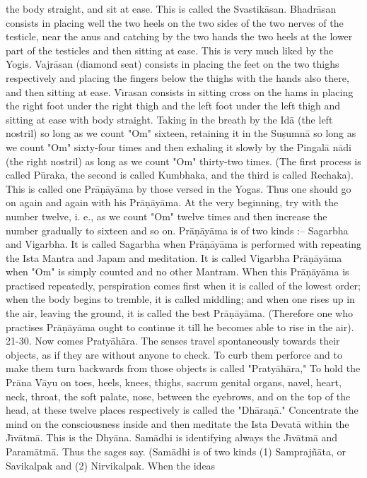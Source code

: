 the body straight, and sit at ease. This is called the Svastik\=asan. Bhadr\=asan consists in placing well the two heels on the two sides of the two nerves of the testicle, near the anus and catching by the two hands the two heels at the lower part of the testicles and then sitting at ease. This is very much liked by the Yogis. Vajr\=asan (diamond seat) consists in placing the feet on the two thighs respectively and placing the fingers below the thighs with the hands also there, and then sitting at ease. V\={\i}rasan consists in sitting cross on the hams in placing the right foot under the right thigh and the left foot under the left thigh and sitting at ease with body straight.
Taking in the breath by the Id\=a (the left nostril) so long as we count "Om" sixteen, retaining it in the Su\d{s}umn\=a so long as we count "Om" sixty-four times and then exhaling it slowly by the Pingal\=a n\=adi (the right nostril) as long as we count "Om" thirty-two times. (The first process is called P\=uraka, the second is called Kumbhaka, and the third is called Rechaka). This is called one Pr\=a\d{n}\=ay\=ama by those versed in the Yogas. Thus one should go on again and again with his Pr\=a\d{n}\=ay\=ama. At the very beginning, try with the number twelve, i. e., as we count "Om" twelve times and then increase the number gradually to sixteen and so on. Pr\=a\d{n}\=ay\=ama is of two kinds :-- Sagarbha and Vigarbha. It is called Sagarbha when Pr\=a\d{n}\=ay\=ama is performed with repeating the Ista Mantra and Japam and meditation. It is called Vigarbha Pr\=a\d{n}\=ay\=ama when "Om" is simply counted and no other Mantram. When this Pr\=a\d{n}\=ay\=ama is practised repeatedly, perspiration comes first when it is called of the lowest order; when the body begins to tremble, it is called middling; and when one rises up in the air, leaving the ground, it is called the best Pr\=a\d{n}\=ay\=ama. (Therefore one who practises Pr\=a\d{n}\=ay\=ama ought to continue it till he becomes able to rise in the air).
21-30. Now comes Praty\=ah\=ara. The senses travel spontaneously towards their objects, as if they are without anyone to check. To curb them perforce and to make them turn backwards from those objects is called "Praty\=ah\=ara," To hold the Pr\=ana V\=ayu on toes, heels, knees, thighs, sacrum genital organs, navel, heart, neck, throat, the soft palate, nose, between the eyebrows, and on the top of the head, at these twelve places respectively is called the "Dh\=ara\d{n}\=a." Concentrate the mind on the consciousness inside and then meditate the Ista Devat\=a within the J\={\i}v\=atm\=a. This is the Dhy\=ana. Sam\=adhi is identifying always the J\={\i}v\=atm\=a and Param\=atm\=a. Thus the sages say. (Sam\=adhi is of two kinds (1) Sampraj\~n\=ata, or Savikalpak and (2) Nirvikalpak. When the ideas

